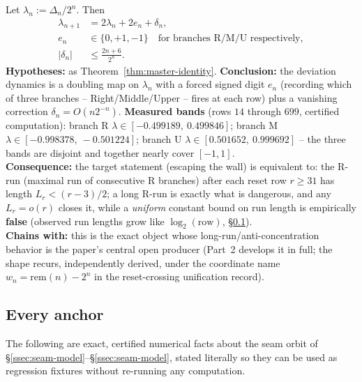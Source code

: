 \begin{thm}
\label{thm:dynamics}
Let $\lambda_n := \Delta_n / 2^n$. Then
\begin{equation*}
\begin{aligned}
\lambda_{n+1} &= 2\lambda_n + 2e_n + \delta_n,\\
e_n &\in \{0,+1,-1\}\quad\text{for branches R/M/U respectively},\\
|\delta_n| &\le \frac{2n+6}{2^n}.
\end{aligned}
\tag{III}
\end{equation*}
\textbf{Hypotheses:} as Theorem~\ref{thm:master-identity}. \textbf{Conclusion:} the deviation
dynamics is a doubling map on $\lambda_n$ with a forced signed digit $e_n$ (recording which of three
branches -- Right/Middle/Upper -- fires at each row) plus a vanishing correction $\delta_n = O(n
2^{-n})$. \textbf{Measured bands} (rows $14$ through $699$, certified computation): branch R
$\lambda \in [-0.499189,\ 0.499846]$; branch M $\lambda \in [-0.998378,\ -0.501224]$; branch U
$\lambda \in [0.501652,\ 0.999692]$ -- the three bands are disjoint and together nearly cover
$[-1,1]$.  
\\
\textbf{Consequence:} the target statement (escaping the wall) is equivalent to: the R-run (maximal
run of consecutive R branches) after each reset row $r \ge 31$ has length $L_r < (r-3)/2$; a long
R-run is exactly what is dangerous, and any $L_r = o(r)$ closes it, while a \emph{uniform} constant
bound on run length is empirically \textbf{false} (observed run lengths grow like
$\log_2(\text{row})$, \S\ref{ssec:anchors}).\\
\textbf{Chains with:} this is the exact object whose long-run/anti-concentration behavior is the
paper's central open producer (Part~2 develops it in full; the shape recurs, independently derived,
under the coordinate name $w_n = \mathrm{rem}(n) - 2^n$ in the reset-crossing unification record).
\end{thm}

\subsection{Every anchor}
\label{ssec:anchors}

The following are exact, certified numerical facts about the seam orbit of
\S\ref{ssec:seam-model}--\S\ref{ssec:seam-model}, stated literally so they can be used as
regression fixtures without re-running any computation.

